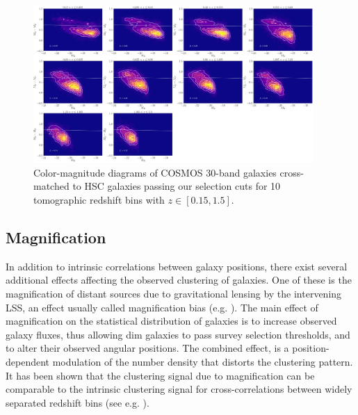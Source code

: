 \documentclass[a4paper,11pt]{article}
\begin{document}

      \begin{figure}
        \begin{center}
          \includegraphics[width=0.95\textwidth]{figures/color-magnitude_cut=COSMOS30_nbin=10_weights=True.pdf}
          \caption{Color-magnitude diagrams of COSMOS 30-band galaxies cross-matched to HSC galaxies passing our selection cuts for 10 tomographic redshift bins with $z \in [0.15, 1.5]$.}
          \label{fig:color-mag}
        \end{center}
      \end{figure}
      
 \subsection{Magnification}\label{ssec:results.magnification}

    In addition to intrinsic correlations between galaxy positions, there exist several additional effects affecting the observed clustering of galaxies. One of these is the magnification of distant sources due to gravitational lensing by the intervening LSS, an effect usually called magnification bias (e.g. \cite{Schneider:1989, Narayan:1989}). The main effect of magnification on the statistical distribution of galaxies is to increase observed galaxy fluxes, thus allowing dim galaxies to pass survey selection thresholds, and to alter their observed angular positions. The combined effect, is a position-dependent modulation of the number density that distorts the clustering pattern. It has been shown that the clustering signal due to magnification can be comparable to the intrinsic clustering signal for cross-correlations between widely separated redshift bins (see e.g. \cite{Challinor:2011}).
\end{document}
